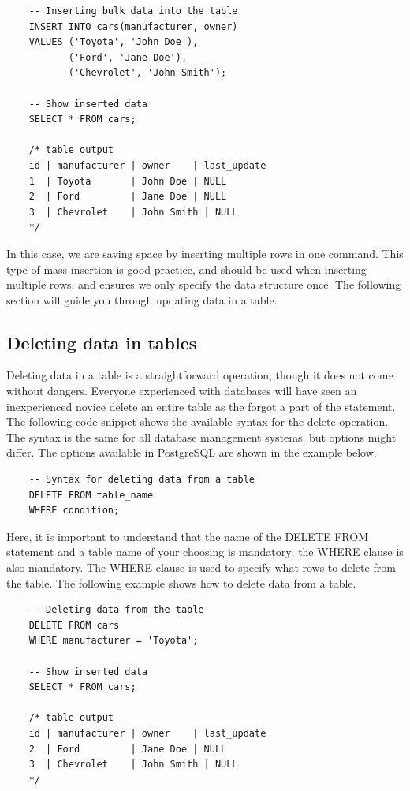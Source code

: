 \begin{verbatim}
    -- Inserting bulk data into the table
    INSERT INTO cars(manufacturer, owner)
    VALUES ('Toyota', 'John Doe'),
           ('Ford', 'Jane Doe'),
           ('Chevrolet', 'John Smith');

    -- Show inserted data
    SELECT * FROM cars;

    /* table output
    id | manufacturer | owner    | last_update
    1  | Toyota       | John Doe | NULL
    2  | Ford         | Jane Doe | NULL
    3  | Chevrolet    | John Smith | NULL
    */
\end{verbatim}

In this case, we are saving space by inserting multiple rows in one command. This type of mass insertion is good practice, and should be used when inserting multiple rows, and ensures we only specify the data structure once. The following section will guide you through updating data in a table.

\subsection{Deleting data in tables}
Deleting data in a table is a straightforward operation, though it does not come without dangers. Everyone experienced with databases will have seen an inexperienced novice delete an entire table as the forgot a part of the statement. The following code snippet shows the available syntax for the delete operation. The syntax is the same for all database management systems, but options might differ. The options available in PostgreSQL are shown in the example below.

\begin{verbatim}
    -- Syntax for deleting data from a table
    DELETE FROM table_name
    WHERE condition;
\end{verbatim}

Here, it is important to understand that the name of the DELETE FROM statement and a table name of your choosing is mandatory; the WHERE clause is also mandatory. The WHERE clause is used to specify what rows to delete from the table. The following example shows how to delete data from a table.

\begin{verbatim}
    -- Deleting data from the table
    DELETE FROM cars
    WHERE manufacturer = 'Toyota';

    -- Show inserted data
    SELECT * FROM cars;

    /* table output
    id | manufacturer | owner    | last_update
    2  | Ford         | Jane Doe | NULL
    3  | Chevrolet    | John Smith | NULL
    */
\end{verbatim}

